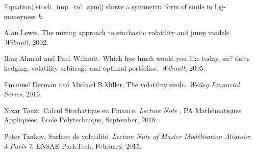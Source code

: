 \documentclass[10pt]{article}
\theoremstyle{plain}
\numberwithin{equation}{section}
\numberwithin{table}{section}
\begin{document}
Equation(\ref{stoch_imp_vol_sym}) shows a symmetric form of smile in log-moneyness $k$.







\begin{appendix}


\end{appendix}
\newpage

\begin{thebibliography}{99}

 Alan Lewis. The mixing approach to stochastic volatility and jump models. {\it
Wilmott}, 2002.

 Riaz Ahmad and Paul Wilmott. Which free lunch would you like today, sir? delta hedging, volatility arbitrage and optimal portfolios. {\it
Wilmott}, 2005.
    
 Emanuel Derman and Michael B.Miller. The volatility smile. {\it
Weiley Financial Series}, 2016.

 Nizar Touzi. Calcul Stochatique en Finance. {\it
Lecture Note} {\bf}, PA Math\'ematiques Appliqu\'ees, Ecole Polytechnique, September, 2018.

 Peter Tankov, Surface de volatilit\'e, {\it
Lecture Note of Master Mod\'elisation Al\'eatoire \`a Paris 7}, ENSAE ParisTech, February, 2015.

\end{thebibliography}
\end{document}
